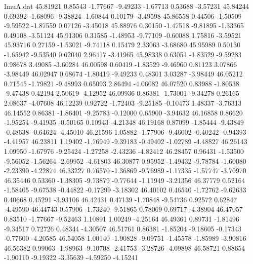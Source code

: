 \begin{filecontents}{ImuA.dat}
  45.81921    0.85543   -1.77667   -9.49233   -1.67713    0.53688   -3.57231
  45.84244    0.69392   -1.68096   -9.38824   -1.60844    0.10179   -3.49598
  45.86558    0.44506   -1.50509   -9.59522   -1.87559    0.07126   -3.45018
  45.88976    0.30150   -1.47518   -9.81895   -1.33365    0.49108   -3.51124
  45.91306    0.31585   -1.48953   -9.77109   -0.60088    1.75816   -3.59521
  45.93716    0.27159   -1.53021   -9.74118    0.15479    2.33063   -3.68680
  45.95989    0.50130   -1.65942   -9.53540    0.62040    2.96417   -3.41965
  45.98338    0.63051   -1.83529   -9.59283    0.98678    3.49085   -3.60284
  46.00598    0.60419   -1.83529   -9.46960    0.81123    3.07866   -3.98449
  46.02947    0.68674   -1.80419   -9.49233    0.48301    3.03287   -3.98449
  46.05212    0.71545   -1.79821   -9.48993    0.65093    2.86494   -4.06082
  46.07520    0.83988   -1.80538   -9.47438    0.42194    2.50619   -4.12952
  46.09936    0.86381   -1.73001   -9.34278    0.26165    2.08637   -4.07608
  46.12239    0.92722   -1.72403   -9.25185   -0.10473    1.48337   -3.76313
  46.14552    0.86381   -1.86401   -9.25783   -0.12000    0.65900   -3.94632
  46.16858    0.86620   -1.95254   -9.41935   -0.50165    0.10943   -4.21348
  46.19168    0.87099   -1.85444   -9.43849   -0.48638   -0.64624   -4.45010
  46.21596    1.05882   -1.77906   -9.46002   -0.40242   -0.94393   -4.41957
  46.23811    1.19402   -1.76949   -9.39183   -0.49402   -1.02789   -4.48827
  46.26143    1.09950   -1.67976   -9.25424   -1.27258   -2.43236   -4.82412
  46.28457    0.96431   -1.53500   -9.56052   -1.56264   -2.69952   -4.61803
  46.30877    0.95952   -1.49432   -9.78784   -1.60080   -2.23390   -4.22874
  46.33227    0.76570   -1.36869   -9.76989   -1.17335   -1.57747   -3.70970
  46.35446    0.53360   -1.38305   -9.73879   -0.77644   -1.11949   -3.21356
  46.37779    0.52164   -1.58405   -9.67538   -0.44822   -0.17299   -3.18302
  46.40102    0.46540   -1.72762   -9.62633    0.40668    0.45291   -3.93106
  46.42431    0.47139   -1.70848   -9.54736    0.92572    0.62847   -4.49590
  46.44743    0.57906   -1.73240   -9.51865    0.78069    0.69717   -4.38904
  46.47057    0.83510   -1.77667   -9.52463    1.10891    1.00249   -4.25164
  46.49361    0.89731   -1.81496   -9.34517    0.72726    0.48344   -4.30507
  46.51761    0.86381   -1.85204   -9.18605   -0.17343   -0.77600   -4.20585
  46.54058    1.00140   -1.90828   -9.09751   -1.45578   -1.85989   -3.90816
  46.56382    0.99063   -1.98963   -9.10708   -2.41753   -3.28726   -4.09898
  46.58721    0.88654   -1.90110   -9.19322   -3.35639   -4.59250   -4.15241

\end{filecontents}

